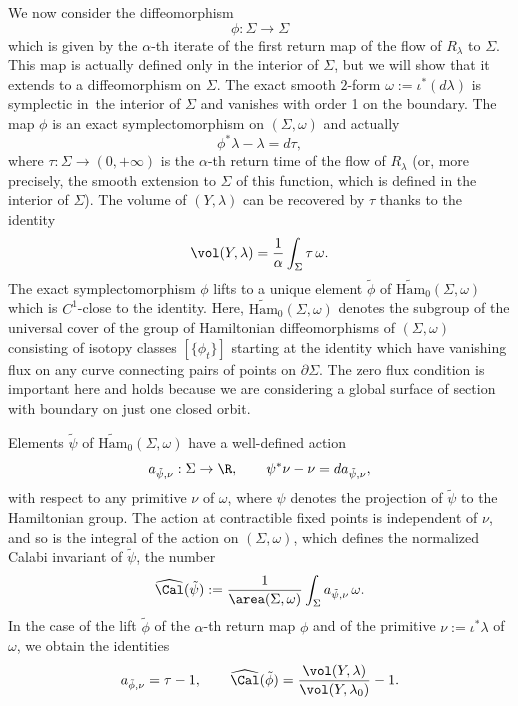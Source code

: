 We now consider the diffeomorphism
\[
\phi: \Sigma\to \Sigma
\]
which is given by the $\alpha$-th iterate of the first return map of the flow of $R_{\lambda}$ to $\Sigma$. This map is actually defined only in the interior of $\Sigma$, but we will show that it extends to a diffeomorphism on $\Sigma$. The exact smooth $2$-form $\omega:= \iota^*(d\lambda)$ is symplectic in~the interior of $\Sigma$ and vanishes with order 1 on the boundary. The map $\phi$ is an exact symplectomorphism on $(\Sigma,\omega)$ and actually
\[
\phi^* \lambda - \lambda = d\tau,
\]
where $\tau: \Sigma \to (0,+\infty)$ is the $\alpha$-th return time of the flow of $R_{\lambda}$ (or, more precisely, the smooth extension to $\Sigma$ of this function, which is defined in the interior of $\Sigma$). The volume of $(Y,\lambda)$ can be recovered by $\tau$ thanks to the identity
\[
\vol(Y,\lambda) = \frac{1}{\alpha} \int_{\Sigma} \tau\, \omega.
\]
The exact symplectomorphism $\phi$ lifts to a unique element $\tilde\phi$ of $\widetilde{\mathrm{Ham}}_0(\Sigma,\omega)$ which is $C^1$-close to the identity. Here, $\widetilde{\mathrm{Ham}}_0(\Sigma,\omega)$ denotes the subgroup of the universal cover of the group of Hamiltonian diffeomorphisms of $(\Sigma,\omega)$ consisting of isotopy classes $[\{\phi_t\}]$ starting at the identity which have vanishing flux on any curve connecting pairs of points on $\partial \Sigma$. The zero flux condition is important here and holds because we are considering a global surface of section with boundary on just one closed orbit.

Elements $\tilde{\psi}$ of $\widetilde{\mathrm{Ham}}_0(\Sigma,\omega)$ have a well-defined action
\[
a_{\tilde{\psi},\nu} : \Sigma \to \R, \qquad \psi^* \nu - \nu = d a_{\tilde{\psi},\nu},
\]
with respect to any primitive $\nu$ of $\omega$, where $\psi$ denotes the projection of $\tilde{\psi}$ to the Hamiltonian group. The action at contractible fixed points is independent of $\nu$, and so is the integral of the action on $(\Sigma,\omega)$, which defines the normalized Calabi invariant of $\tilde{\psi}$, \ie the number
\[
\widehat{\Cal}(\tilde{\psi}) := \frac{1}{\area(\Sigma,\omega)} \int_{\Sigma} a_{\tilde{\psi},\nu} \, \omega.
\]
In the case of the lift $\tilde{\phi}$ of the $\alpha$-th return map $\phi$ and of the primitive $\nu:= \iota^*\lambda$ of $\omega$, we obtain the identities
\begin{equation}
\label{intro1}
a_{\tilde{\phi},\nu} = \tau - 1, \qquad \widehat{\Cal}(\tilde{\phi}) = \frac{\vol(Y,\lambda)}{\vol(Y,\lambda_0)} - 1.
\end{equation}

